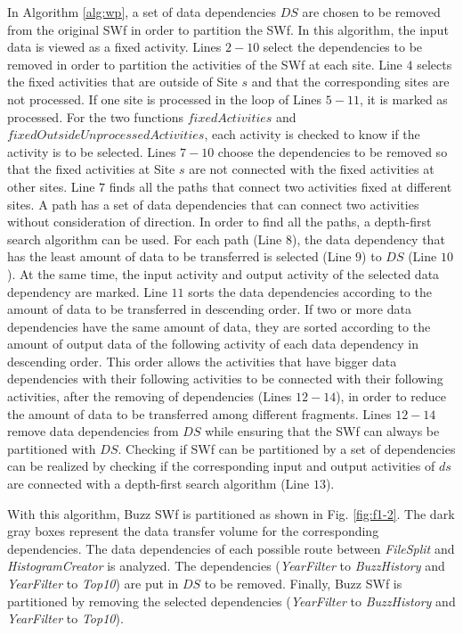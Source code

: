 In Algorithm \ref{alg:wp}, a set of data dependencies $DS$ are chosen to be removed from the original SWf in order to partition the SWf. In this algorithm, the input data is viewed as a fixed activity. Lines $2-10$ select the dependencies to be removed in order to partition the activities of the SWf at each site. Line $4$ selects the fixed activities that are outside of Site $s$ and that the corresponding sites are not processed. If one site is processed in the loop of Lines $5-11$, it is marked as processed. For the two functions $fixedActivities$ and $fixedOutsideUnprocessedActivities$, each activity is checked to know if the activity is to be selected. Lines $7 - 10$ choose the dependencies to be removed so that the fixed activities at Site $s$ are not connected with the fixed activities at other sites. 
Line $7$ finds all the paths that connect two activities fixed at different sites. A path has a set of data dependencies that can connect two activities without consideration of direction. 
In order to find all the paths, a depth-first search algorithm can be used. For each path (Line $8$), the data dependency that has the least amount of data to be transferred is selected (Line $9$) to $DS$ (Line $10$).  
At the same time, the input activity and output activity of the selected data dependency are marked.
Line $11$ sorts the data dependencies according to the amount of data to be transferred in descending order. If two or more data dependencies have the same amount of data, they are sorted according to the amount of output data of the following activity of each data dependency in descending order. This order allows the activities that have bigger data dependencies with their following activities to be connected with their following activities, after the removing of dependencies (Lines $12-14$), in order to reduce the amount of data to be transferred among different fragments. Lines $12-14$ remove data dependencies from $DS$ while ensuring that the SWf can always be partitioned with $DS$. Checking if SWf can be partitioned by a set of dependencies can be realized by checking if the corresponding input and output activities of $ds$ are connected with a depth-first search algorithm (Line $13$).

With this algorithm, Buzz SWf is partitioned as shown in Fig. \ref{fig:f1-2}. 
The dark gray boxes represent the data transfer volume for the corresponding dependencies.
The data dependencies of each possible route between \textit{FileSplit} and \textit{HistogramCreator} is analyzed. 
The dependencies (\textit{YearFilter} to \textit{BuzzHistory} and \textit{YearFilter} to \textit{Top10}) are put in $DS$ to be removed.
Finally, Buzz SWf is partitioned by removing the selected dependencies (\textit{YearFilter} to \textit{BuzzHistory} and \textit{YearFilter} to \textit{Top10}).


